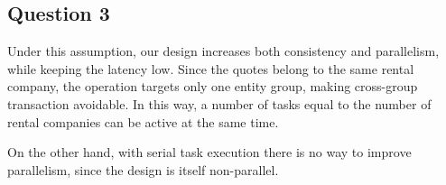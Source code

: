\subsection{Question 3}
Under this assumption, our design increases both consistency and parallelism, while keeping the latency low. Since the quotes belong to the same rental company, the operation targets only one entity group, making cross-group transaction avoidable. In this way, a number of tasks equal to the number of rental companies can be active at the same time.

On the other hand, with serial task execution there is no way to improve parallelism, since the design is itself non-parallel.